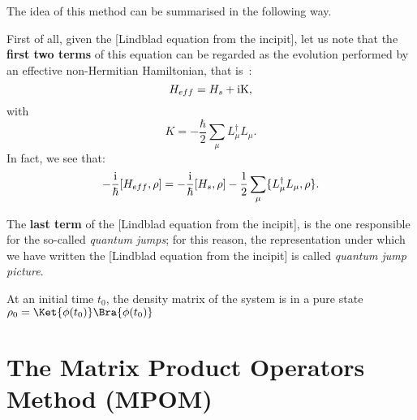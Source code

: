 The idea of this method can be summarised in the following way.

First of all, given the [Lindblad equation from the incipit], let us note that the \textbf{first two terms} of this equation can be regarded as the evolution performed by an effective non-Hermitian Hamiltonian, that is~\cite{PhysRevA.69.062317}:
\[
H_{eff} = H_s + \rm{i}K,
\]
with
\[
K = -\frac{\hbar}{2}\sum_\mu L_{\mu}^{\dagger}L_{\mu}.
\]
In fact, we see that:
\[
    -\frac{\rm{i}}{\hbar}[H_{eff}, \rho] = -\frac{\rm{i}}{\hbar}[H_s, \rho] - \frac{1}{2}\sum_\mu \{L_{\mu}^{\dagger}L_{\mu}, \rho\}.
\]

The \textbf{last term} of the [Lindblad equation from the incipit], is the one responsible for the so-called \emph{quantum jumps}; for this reason, the representation under which we have written the [Lindblad equation from the incipit] is called \emph{quantum jump picture}. 

At an initial time $t_0$, the density matrix of the system is in a pure state $\rho_0 = \Ket{\phi(t_0)}\Bra{\phi(t_0)}$ 



\section{The Matrix Product Operators Method (MPOM)}
